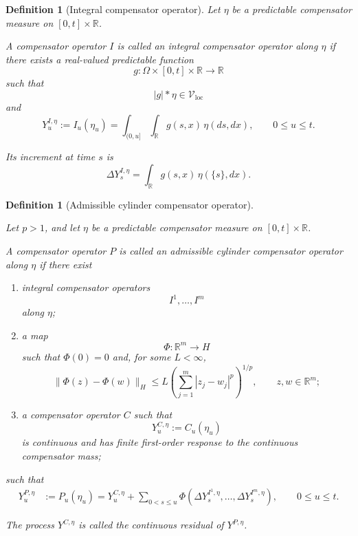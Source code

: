 \documentclass[a4paper,10pt]{article}
\newtheorem{defin}[thm]{Definition}
\begin{document}
\begin{defin}[Integral compensator operator]
Let \(\eta\) be a predictable compensator measure on
\([0,t]\times\mathbb R\).

A compensator operator \(I\) is called an integral compensator
operator along \(\eta\) if there exists a real-valued predictable
function
\[
        g:\Omega\times[0,t]\times\mathbb R\longrightarrow\mathbb R
\]
such that
\[
        |g|*\eta\in\mathcal V_{\mathrm{loc}}
\]
and
\[
        Y_u^{I,\eta}
        :=
        I_u(\eta_u)
        =
        \int_{(0,u]}\int_{\mathbb R}
        g(s,x)\,\eta(ds,dx),
        \qquad 0\le u\le t.
\]

Its increment at time \(s\) is
\[
        \Delta Y_s^{I,\eta}
        =
        \int_{\mathbb R}
        g(s,x)\,\eta(\{s\},dx).
\]
\end{defin}


\begin{defin}[Admissible cylinder compensator operator]
\label{defin:admissible-cylinder-compensator-operator}

Let \(p>1\), and let \(\eta\) be a predictable compensator measure
on \([0,t]\times\mathbb R\).

A compensator operator \(P\) is called an admissible cylinder
compensator operator along \(\eta\) if there exist

\begin{enumerate}
\item
integral compensator operators
\[
        I^1,\ldots,I^m
\]
along \(\eta\);

\item
a map
\[
        \Phi:\mathbb R^m\longrightarrow H
\]
such that \(\Phi(0)=0\) and, for some \(L<\infty\),
\[
        \lVert\Phi(z)-\Phi(w)\rVert_H
        \le
        L
        \left(
        \sum_{j=1}^m|z_j-w_j|^p
        \right)^{1/p},
        \qquad z,w\in\mathbb R^m;
\]

\item
a compensator operator \(C\) such that
\[
        Y_u^{C,\eta}:=C_u(\eta_u)
\]
is continuous and has finite first-order response to the
continuous compensator mass;
\end{enumerate}

such that
\[
\begin{aligned}
Y_u^{P,\eta}
&:=
P_u(\eta_u)
=
Y_u^{C,\eta}
+
\sum_{0<s\le u}
\Phi\left(
        \Delta Y_s^{I^1,\eta},
        \ldots,
        \Delta Y_s^{I^m,\eta}
\right),
\qquad 0\le u\le t.
\end{aligned}
\]

The process \(Y^{C,\eta}\) is called the continuous residual of
\(Y^{P,\eta}\).
\end{defin}
\end{document}

